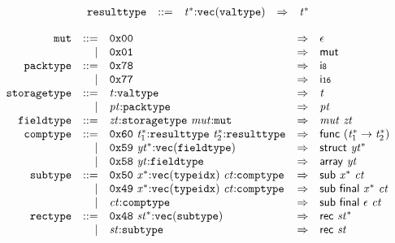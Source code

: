 \vspace{1ex}

$$
\begin{array}{@{}l@{}rrlll@{}l@{}}
& {\mathtt{resulttype}} &::=& {{\mathit{t}}^\ast}{:}{\mathtt{vec}}({\mathtt{valtype}}) &\Rightarrow& {{\mathit{t}}^\ast} \\
\end{array}
$$

\vspace{1ex}

$$
\begin{array}{@{}l@{}rrlll@{}l@{}}
& {\mathtt{mut}} &::=& \mathtt{0x00} &\Rightarrow& \epsilon \\ &&|&
\mathtt{0x01} &\Rightarrow& \mathsf{mut} \\
& {\mathtt{packtype}} &::=& \mathtt{0x78} &\Rightarrow& \mathsf{i{\scriptstyle8}} \\ &&|&
\mathtt{0x77} &\Rightarrow& \mathsf{i{\scriptstyle16}} \\
& {\mathtt{storagetype}} &::=& {\mathit{t}}{:}{\mathtt{valtype}} &\Rightarrow& {\mathit{t}} \\ &&|&
{\mathit{pt}}{:}{\mathtt{packtype}} &\Rightarrow& {\mathit{pt}} \\
& {\mathtt{fieldtype}} &::=& {\mathit{zt}}{:}{\mathtt{storagetype}}~{\mathit{mut}}{:}{\mathtt{mut}} &\Rightarrow& {\mathit{mut}}~{\mathit{zt}} \\
& {\mathtt{comptype}} &::=& \mathtt{0x60}~{{\mathit{t}}_{{1}}^\ast}{:}{\mathtt{resulttype}}~{{\mathit{t}}_{{2}}^\ast}{:}{\mathtt{resulttype}} &\Rightarrow& \mathsf{func}~({{\mathit{t}}_{{1}}^\ast} \rightarrow {{\mathit{t}}_{{2}}^\ast}) \\ &&|&
\mathtt{0x59}~{{\mathit{yt}}^\ast}{:}{\mathtt{vec}}({\mathtt{fieldtype}}) &\Rightarrow& \mathsf{struct}~{{\mathit{yt}}^\ast} \\ &&|&
\mathtt{0x58}~{\mathit{yt}}{:}{\mathtt{fieldtype}} &\Rightarrow& \mathsf{array}~{\mathit{yt}} \\
& {\mathtt{subtype}} &::=& \mathtt{0x50}~{{\mathit{x}}^\ast}{:}{\mathtt{vec}}({\mathtt{typeidx}})~{\mathit{ct}}{:}{\mathtt{comptype}} &\Rightarrow& \mathsf{sub}~{{\mathit{x}}^\ast}~{\mathit{ct}} \\ &&|&
\mathtt{0x49}~{{\mathit{x}}^\ast}{:}{\mathtt{vec}}({\mathtt{typeidx}})~{\mathit{ct}}{:}{\mathtt{comptype}} &\Rightarrow& \mathsf{sub}~\mathsf{final}~{{\mathit{x}}^\ast}~{\mathit{ct}} \\ &&|&
{\mathit{ct}}{:}{\mathtt{comptype}} &\Rightarrow& \mathsf{sub}~\mathsf{final}~\epsilon~{\mathit{ct}} \\
& {\mathtt{rectype}} &::=& \mathtt{0x48}~{{\mathit{st}}^\ast}{:}{\mathtt{vec}}({\mathtt{subtype}}) &\Rightarrow& \mathsf{rec}~{{\mathit{st}}^\ast} \\ &&|&
{\mathit{st}}{:}{\mathtt{subtype}} &\Rightarrow& \mathsf{rec}~{\mathit{st}} \\
\end{array}
$$


